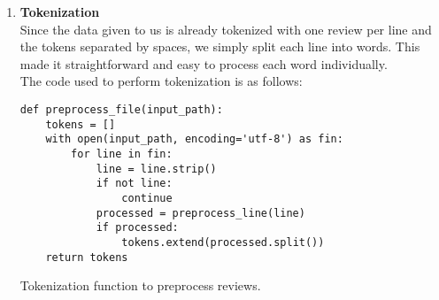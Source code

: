 \documentclass[a4paper]{article}
\begin{document}
\begin{enumerate}
    \begin{itemize}
        \item \verb|re.sub(pattern, repl, text)| replaces all occurrences of the regex pattern in text with repl (here, a space `' '`).
        \item The pattern \verb|r"[^\w\s]"| means:
        \begin{itemize}
            \item \verb|[...]| : a character class (matches any character inside the brackets)
            \item \verb|^| : negation (matches any character not in the set)
            \item \verb|\w| : matches any ``word'' character (letters, digits, or underscore)
            \item \verb|\s| : matches any whitespace character (spaces, tabs, newlines)
        \end{itemize}
        So, \verb|[^\w\s]| matches any character that is not a word character and not whitespace (i.e., punctuation and symbols). 
        All such characters are replaced with a space. 
        Finally, \verb|.strip()| removes leading and trailing whitespace from the result.
    \end{itemize}

    \item \textbf{Tokenization} \\
    Since the data given to us is already tokenized with one review per line and the tokens separated by spaces, we simply split each line into words. 
    This made it straightforward and easy to process each word individually. \\

    The code used to perform tokenization is as follows:

    \begin{listing}[ht]
    \begin{verbatim}
def preprocess_file(input_path):
    tokens = []
    with open(input_path, encoding='utf-8') as fin:
        for line in fin:
            line = line.strip()
            if not line:
                continue
            processed = preprocess_line(line)
            if processed:
                tokens.extend(processed.split())
    return tokens
    \end{verbatim}
    \caption{Tokenization function to preprocess reviews.}
    \label{lst:token}
    \end{listing}


\end{enumerate}
\end{document}
